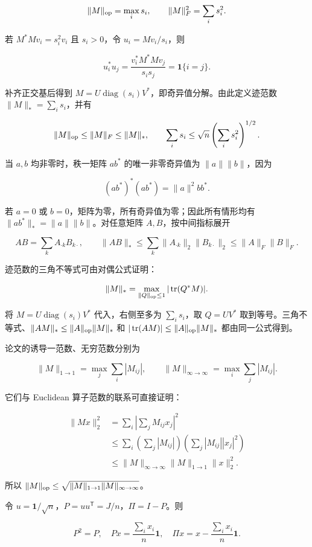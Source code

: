 \documentclass[11pt,a4paper]{article}
\begin{document}
\[\|M\|_{\rm op}=\max_i s_i,\qquad \|M\|_F^2=\sum_i s_i^2.\]

若 \(M^*Mv_i=s_i^2v_i\) 且 \(s_i>0\)，令 \(u_i=Mv_i/s_i\)，则

\[u_i^*u_j=\frac{v_i^*M^*Mv_j}{s_is_j}=\mathbf1\{i=j\}.\]

补齐正交基后得到 \(M=U\operatorname{diag}(s_i)V^*\)，即奇异值分解。由此定义迹范数 \(\|M\|_*=\sum_i s_i\)，并有

\[\|M\|_{\rm op}\le\|M\|_F\le\|M\|_*,\qquad
\sum_i s_i\le\sqrt n\left(\sum_i s_i^2\right)^{1/2}.\]

当 \(a,b\) 均非零时，秩一矩阵 \(ab^*\) 的唯一非零奇异值为 \(\|a\|\|b\|\)，因为

\[(ab^*)^*(ab^*)=\|a\|^2bb^*.\]

若 \(a=0\) 或 \(b=0\)，矩阵为零，所有奇异值为零；因此所有情形均有 \(\|ab^*\|_*=\|a\|\|b\|\)。对任意矩阵 \(A,B\)，按中间指标展开

\[AB=\sum_kA_{\cdot k}B_{k\cdot},\qquad
\|AB\|_*\le\sum_k\|A_{\cdot k}\|_2\|B_{k\cdot}\|_2
\le\|A\|_F\|B\|_F.\]

迹范数的三角不等式可由对偶公式证明：

\[\|M\|_*=\max_{\|Q\|_{\rm op}\le1}|\operatorname{tr}(Q^*M)|.\]

将 \(M=U\operatorname{diag}(s_i)V^*\) 代入，右侧至多为 \(\sum_i s_i\)，取 \(Q=UV^*\) 取到等号。三角不等式、\(\|AM\|_*\le\|A\|_{\rm op}\|M\|_*\) 和 \(|\operatorname{tr}(AM)|\le\|A\|_{\rm op}\|M\|_*\) 都由同一公式得到。

论文的诱导一范数、无穷范数分别为

\[\|M\|_{1\to1}=\max_j\sum_i|M_{ij}|,\qquad
\|M\|_{\infty\to\infty}=\max_i\sum_j|M_{ij}|.\]

它们与 Euclidean 算子范数的联系可直接证明：

\[\begin{aligned}
\|Mx\|_2^2
&=\sum_i\left|\sum_jM_{ij}x_j\right|^2\\
&\le\sum_i\left(\sum_j|M_{ij}|\right)
\left(\sum_j|M_{ij}||x_j|^2\right)\\
&\le\|M\|_{\infty\to\infty}\|M\|_{1\to1}\|x\|_2^2.
\end{aligned}\]

所以 \(\|M\|_{\rm op}\le\sqrt{\|M\|_{1\to1}\|M\|_{\infty\to\infty}}\)。

令 \(u=\mathbf1/\sqrt n\)，\(P=uu^{\mathsf T}=J/n\)，\(\Pi=I-P\)。则

\[P^2=P,\quad Px=\frac{\sum_ix_i}{n}\mathbf1,\quad
\Pi x=x-\frac{\sum_ix_i}{n}\mathbf1.\]
\end{document}
